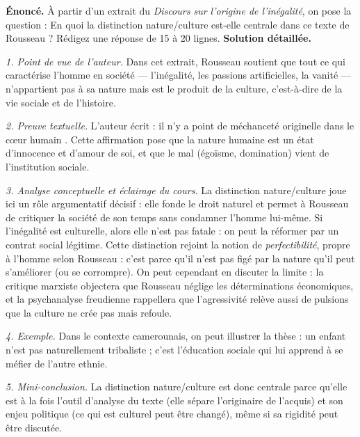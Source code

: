 \documentclass[11pt]{article}
\newcounter{popsec}
\newcounter{popsub}
\newcommand{\courssub}[1]{%
  \stepcounter{popsub}%
  \par\vspace{9pt}\noindent{\popxbold\fontsize{11.5}{13}\selectfont\color{popink}{\color{poporange}\thepopsec.\thepopsub}\hspace{6pt}#1}\par\nopagebreak\vspace{4pt}
}
\begin{document}
\begin{exoresolu}
\textbf{Énoncé.} À partir d'un extrait du \emph{Discours sur l'origine de l'inégalité}, on pose la question : \og En quoi la distinction nature/culture est-elle centrale dans ce texte de Rousseau ? \fg{} Rédigez une réponse de 15 à 20 lignes.
\tcblower
\textbf{Solution détaillée.}

\emph{1. Point de vue de l'auteur.} Dans cet extrait, Rousseau soutient que tout ce qui caractérise l'homme en société — l'inégalité, les passions artificielles, la vanité — n'appartient pas à sa nature mais est le produit de la culture, c'est-à-dire de la vie sociale et de l'histoire.

\emph{2. Preuve textuelle.} L'auteur écrit : \og il n'y a point de méchanceté originelle dans le cœur humain \fg{}. Cette affirmation pose que la nature humaine est un état d'innocence et d'amour de soi, et que le mal (égoïsme, domination) vient de l'institution sociale.

\emph{3. Analyse conceptuelle et éclairage du cours.} La distinction nature/culture joue ici un rôle argumentatif décisif : elle fonde le droit naturel et permet à Rousseau de critiquer la société de son temps sans condamner l'homme lui-même. Si l'inégalité est culturelle, alors elle n'est pas fatale : on peut la réformer par un contrat social légitime. Cette distinction rejoint la notion de \emph{perfectibilité}, propre à l'homme selon Rousseau : c'est parce qu'il n'est pas figé par la nature qu'il peut s'améliorer (ou se corrompre). On peut cependant en discuter la limite : la critique marxiste objectera que Rousseau néglige les déterminations économiques, et la psychanalyse freudienne rappellera que l'agressivité relève aussi de pulsions que la culture ne crée pas mais refoule.

\emph{4. Exemple.} Dans le contexte camerounais, on peut illustrer la thèse : un enfant n'est pas naturellement tribaliste ; c'est l'éducation sociale qui lui apprend à se méfier de l'autre ethnie.

\emph{5. Mini-conclusion.} La distinction nature/culture est donc centrale parce qu'elle est à la fois l'outil d'analyse du texte (elle sépare l'originaire de l'acquis) et son enjeu politique (ce qui est culturel peut être changé), même si sa rigidité peut être discutée.
\end{exoresolu}

\courssub{S'auto-évaluer : la grille du correcteur}
\end{document}
